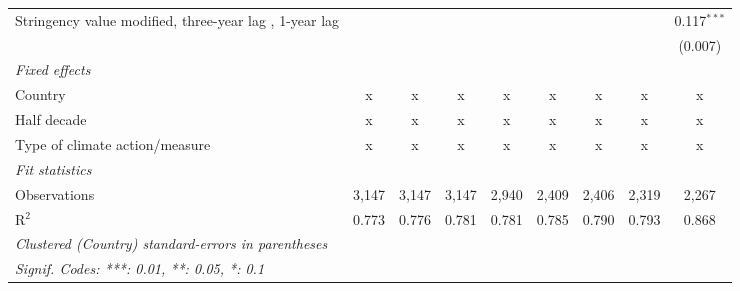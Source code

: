 \begin{table}[htbp]
\begin{tabular}{lcccccccc}
      Stringency value modified, three-year lag , 1-year lag                                  &         &              &              &               &               &               &               & 0.117$^{***}$\\   
                                                                                              &         &              &              &               &               &               &               & (0.007)\\   
      \emph{Fixed effects}\\
      Country                                                                                 & x       & x            & x            & x             & x             & x             & x             & x\\  
      Half decade                                                                             & x       & x            & x            & x             & x             & x             & x             & x\\  
      Type of climate action/measure                                                          & x       & x            & x            & x             & x             & x             & x             & x\\  
      \midrule \emph{Fit statistics}\\
      Observations                                                                            & 3,147   & 3,147        & 3,147        & 2,940         & 2,409         & 2,406         & 2,319         & 2,267\\  
      R$^2$                                                                                   & 0.773   & 0.776        & 0.781        & 0.781         & 0.785         & 0.790         & 0.793         & 0.868\\  
      \midrule
      \multicolumn{9}{l}{\emph{Clustered (Country) standard-errors in parentheses}}\\
      \multicolumn{9}{l}{\emph{Signif. Codes: ***: 0.01, **: 0.05, *: 0.1}}\\
   \end{tabular}
\end{table}


